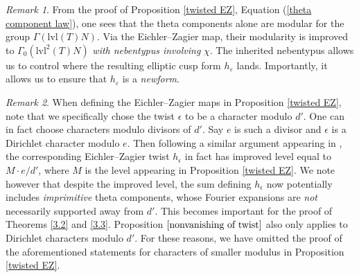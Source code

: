 \documentclass[11pt]{article}
\theoremstyle{definition}
\theoremstyle{remark}
\newtheorem*{remark}{Remark}
\begin{document}
\begin{remark} \label{seeing the level}
    From the proof of Proposition \ref{twisted EZ}, Equation (\ref{theta component law}), one sees that the theta components alone are modular for the group $\Gamma(\text{lvl}(T)N)$. Via the Eichler--Zagier map, their modularity is improved to $\Gamma_0(\text{lvl}^2(T)N)$ \textit{with nebentypus involving} $\chi$. The inherited nebentypus allows us to control where the resulting elliptic cusp form $h_\varepsilon$ lands. Importantly, it allows us to ensure that $h_\varepsilon$ is a \textit{newform}. \\

\end{remark}

\begin{remark}
    When defining the Eichler--Zagier maps in Proposition \ref{twisted EZ}, note that we specifically chose the twist $\epsilon$ to be a character modulo $d'$. One can in fact choose characters modulo divisors of $d'$. Say $e$ is such a divisor and $\epsilon$ is a Dirichlet character modulo $e$. Then following a similar argument appearing in \cite{Kramer}, the corresponding Eichler--Zagier twist $h_\epsilon$ in fact has improved level equal to $M\cdot e/d'$, where $M$ is the level appearing in Proposition \ref{twisted EZ}. We note however that despite the improved level, the sum defining $h_\epsilon$ now potentially includes \textit{imprimitive} theta components, whose Fourier expansions are \textit{not} necessarily supported away from $d'$. This becomes important for the proof of Theorems \ref{3.2} and \ref{3.3}. Proposition $\ref{nonvanishing of twist}$ also only applies to Dirichlet characters modulo $d'$. For these reasons, we have omitted the proof of the aforementioned statements for characters of smaller modulus in Proposition \ref{twisted EZ}. 
\end{remark} 



\end{document}
